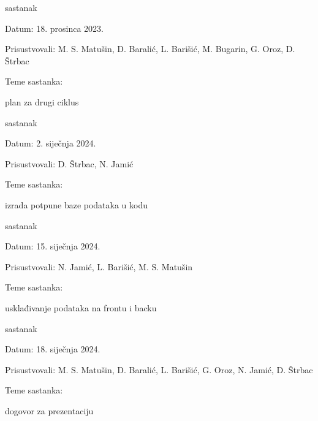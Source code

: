 \begin{packed_enum}
			\item  sastanak
			\item[] \begin{packed_item}
				\item Datum: 18. prosinca 2023.
				\item Prisustvovali: M. S. Matušin, D. Baralić, L. Barišić, M. Bugarin, G. Oroz, D. Štrbac
				\item Teme sastanka:
				\begin{packed_item}
					\item  plan za drugi ciklus
				\end{packed_item}
			\end{packed_item}
			
			\item  sastanak	
			\item[] \begin{packed_item}
				\item Datum: 2. siječnja 2024.
				\item Prisustvovali: D. Štrbac, N. Jamić
				\item Teme sastanka:
				\begin{packed_item}
					\item  izrada potpune baze podataka u kodu
				\end{packed_item}
			\end{packed_item}
			
			\item  sastanak	
			\item[] \begin{packed_item}
				\item Datum: 15. siječnja 2024.
				\item Prisustvovali: N. Jamić, L. Barišić, M. S. Matušin
				\item Teme sastanka:
				\begin{packed_item}
					\item  usklađivanje podataka na frontu i backu 
				\end{packed_item}
			\end{packed_item}
			
			\item  sastanak	
			\item[] \begin{packed_item}
				\item Datum: 18. siječnja 2024.
				\item Prisustvovali:  M. S. Matušin, D. Baralić, L. Barišić, G. Oroz, N. Jamić, D. Štrbac
				\item Teme sastanka:
				\begin{packed_item}
					\item  dogovor za prezentaciju 
				\end{packed_item}
			\end{packed_item}
				
		
			
			
		\end{packed_enum}
		

